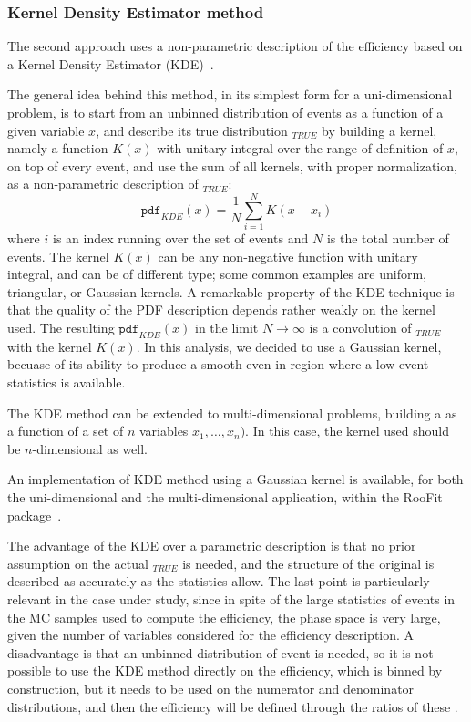 \subsubsection{Kernel Density Estimator method}\label{sec:eff_kde}
The second approach uses a non-parametric description of the efficiency based on a Kernel Density Estimator (KDE)~\cite{opac-b1089297,Cranmer:2000du}.

The general idea behind this method, in its simplest form for a uni-dimensional problem, is to start from an unbinned distribution of events as a function of a given variable $x$, and describe its true distribution \pdf$_{TRUE}$ by building a kernel, namely a function $K(x)$ with unitary integral over the range of definition of $x$, on top of every event, and use the sum of all kernels, with proper normalization, as a non-parametric description of \pdf$_{TRUE}$:
\begin{equation}\label{eq:KDE}
    \mathtt{pdf}_{KDE}(x)=\frac{1}{N}\sum_{i=1}^{N} K(x-x_i)
\end{equation}
where $i$ is an index running over the set of events and $N$ is the total number of events.
The kernel $K(x)$ can be any non-negative function with unitary integral, and can be of different type; some common examples are uniform, triangular, or Gaussian kernels.
A remarkable property of the KDE technique is that the quality of the PDF description depends rather weakly on the kernel used.
The resulting $\mathtt{pdf}_{KDE}(x)$ in the limit $N\to\infty$ is a convolution of \pdf$_{TRUE}$ with the kernel $K(x)$.
In this analysis, we decided to use a Gaussian kernel, becuase of its ability to produce a smooth \pdf even in region where a low event statistics is available.

The KDE method can be extended to multi-dimensional problems, building a \pdf as a function of a set of $n$ variables $x_1,\ldots,x_n)$.
In this case, the kernel used should be $n$-dimensional as well.

An implementation of KDE method using a Gaussian kernel is available, for both the uni-dimensional and the multi-dimensional application, within the {\sc RooFit} package~\cite{RooFit}.

The advantage of the KDE over a parametric description is that no prior assumption on the actual \pdf$_{TRUE}$ is needed, and the structure of the original \pdf is described as accurately as the statistics allow.
The last point is particularly relevant in the case under study, since in spite of the large statistics of events in the MC samples used to compute the efficiency, the phase space is very large, given the number of variables considered for the efficiency description.
A disadvantage is that an unbinned distribution of event is needed, so it is not possible to use the KDE method directly on the efficiency, which is binned by construction, but it needs to be used on the numerator and denominator distributions, and then the efficiency will be defined through the ratios of these \pdfs.


